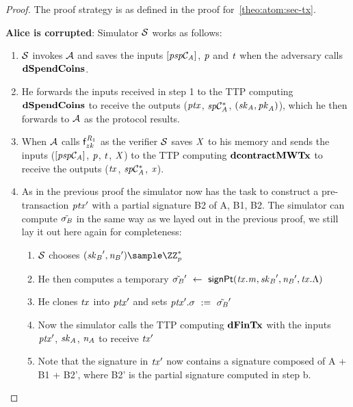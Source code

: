 \begin{proof}
    The proof strategy is as defined in the proof for~\cref{theo:atom:sec-tx}.

    \textbf{Alice is corrupted}: Simulator $\mathcal{S}$ works as follows:
    \begin{enumerate}
        \item $\mathcal{S}$ invokes $\mathcal{A}$ and saves the inputs $[\mathit{psp}\mathcal{C}_{\mathit{A}}]$, $\mathit{p}$ and $\mathit{t}$ when the adversary calls $\mathbf{dSpendCoins}$.
        \item He forwards the inputs received in step 1 to the TTP computing $\mathbf{dSpendCoins}$ to receive the outputs ($\mathit{ptx}$, $\mathit{sp}\mathcal{C}_{\mathit{A}}^*$, $(\mathit{sk}_{\mathit{A}}, \mathit{pk}_{\mathit{A}})$), which he then forwards to $\mathcal{A}$ as the protocol results.
        \item When $\mathcal{A}$ calls $\mathsf{f}^{\mathit{R}_1}_{zk}$ as the verifier $\mathcal{S}$ saves $\mathit{X}$ to his memory and sends the inputs ($[\mathit{psp}\mathcal{C}_{\mathit{A}}]$, $\mathit{p}$, $\mathit{t}$, $\mathit{X}$) to the TTP computing $\mathbf{dcontractMWTx}$ to receive the outputs ($\mathit{tx}$, $\mathit{sp}\mathcal{C}_{\mathit{A}}^*$, $\mathit{x}$).
        \item As in the previous proof the simulator now has the task to construct a pre-transaction ${\mathit{ptx}}'$ with a partial signature B2 of A, B1, B2.
        The simulator can compute $\tilde{\sigma_{\mathit{B}}}$ in the same way as we layed out in the previous proof, we still lay it out here again for completeness:
        \begin{enumerate}
            \item $\mathcal{S}$ chooses $(\funStarAlt{\varSecKeyBob}, \funStarAlt{\varNonceBob}) \sample \cnstIntegersPrimeWithoutZero{\varPrime}$
            \item He then computes a temporary ${\tilde{\sigma_{\mathit{B}}}}' ~\leftarrow~ \mathsf{signPt}(\mathit{tx}.\mathit{m}, {\mathit{sk}_{\mathit{B}}}', {\mathit{\mathit{n}_{\mathit{B}}}}', \mathit{tx}.\Lambda)$
            \item He clones $\mathit{tx}$ into ${\mathit{ptx}}'$ and sets ${\mathit{ptx}}'.\sigma ~:=~ {\tilde{\sigma_{\mathit{B}}}}'$
            \item Now the simulator calls the TTP computing $\mathbf{dFinTx}$ with the inputs ${\mathit{ptx}}'$, $\mathit{sk}_{\mathit{A}}$, $\mathit{\mathit{n}_{\mathit{A}}}$ to receive ${\mathit{tx}}'$
            \item Note that the signature in ${\mathit{tx}}'$ now contains a signature composed of A + B1 + B2', where B2' is the partial signature computed in step b.

\end{enumerate}
\end{enumerate}
\end{proof}
